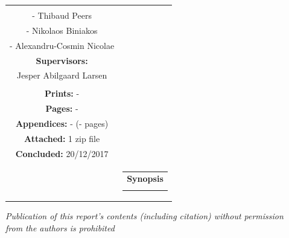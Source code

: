 \begin{nopagebreak}
{\begin{tabular}{cc}
{{\textbf{Participants:}\\
- Thibaud Peers \\
- Nikolaos Biniakos\\
- Alexandru-Cosmin Nicolae\\

\textbf{Supervisors:}\\
Jesper Abilgaard Larsen \\ %
}\\

\textbf{Prints:} -\\
\textbf{Pages:} -\\
\textbf{Appendices:} - (- pages)\\
\textbf{Attached:} 1 zip file\\
\textbf{Concluded:} 20/12/2017\\

\vfill } &
\parbox{7cm}{
  \vspace{.15cm}
  \hfill
  \begin{tabular}{l}
  {\textbf{Synopsis}}\bigskip \\
  \fbox{
    \parbox{6.5cm}{\bigskip
     {\vfill{\small 
     \bigskip}}
     }}
   \end{tabular}}
\end{tabular}} %

\textit{\phantom{A}Publication of this report's contents (including citation) without permission\\ \phantom{A}from the authors is prohibited}\\

\end{nopagebreak}
%
